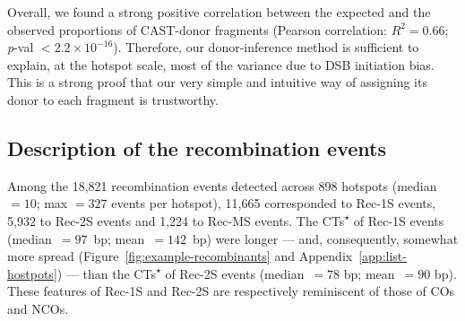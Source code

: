 Overall, we found a strong positive correlation between the expected and the observed proportions of CAST-donor fragments (Pearson correlation: $R^2 = 0.66$; {\textit{p}-val $< 2.2 \times 10^{-16}$}).
Therefore, our donor-inference method is sufficient to explain, at the hotspot scale, most of the variance due to DSB initiation bias. This is a strong proof that our very simple and intuitive way of assigning its donor to each fragment is trustworthy.



\subsection{Description of the recombination events} 

Among the 18,821 recombination events detected across 898 hotspots (median~$= 10$; max $= 327$ events per hotspot), 11,665 corresponded to Rec-1S events, 5,932 to Rec-2S events and 1,224 to Rec-MS events.
The CTs\textsuperscript{$\star$} of Rec-1S events (median~$= 97$~bp; mean~$= 142$~bp) were longer — and, consequently, somewhat more spread (Figure~\ref{fig:example-recombinants} and Appendix~\ref{app:list-hostpots}) — than the CTs\textsuperscript{$\star$} of Rec-2S events (median~$= 78$ bp; mean~$= 90$ bp).
These features of Rec-1S and Rec-2S are respectively reminiscent of those of COs and NCOs.

%

